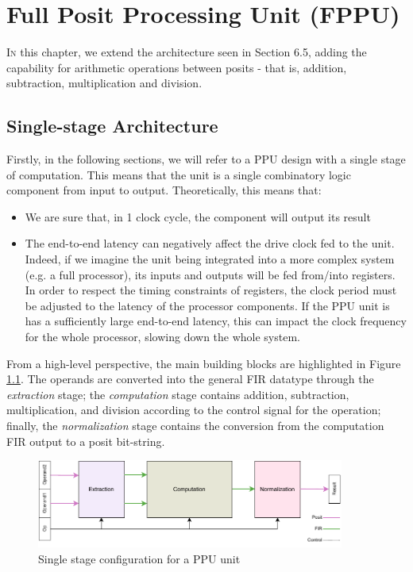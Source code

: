 \chapter{Full Posit Processing Unit (FPPU)}\label{chap:posit_fullppu}

\lettrine{I}{n} this chapter, we extend the architecture seen in Section 6.5, adding the capability for arithmetic operations between posits - that is, addition, subtraction, multiplication and division.



\section{Single-stage Architecture}

Firstly, in the following sections, we will refer to a PPU design with a single stage of computation. This means that the unit is a single combinatory logic component from input to output.
Theoretically, this means that:
\begin{itemize}
    \item We are sure that, in 1 clock cycle, the component will output its result
    \item The end-to-end latency can negatively affect the drive clock fed to the unit. Indeed, if we imagine the unit being integrated into a more complex system (e.g. a full processor), its inputs and outputs will be fed from/into registers. In order to respect the timing constraints of registers, the clock period must be adjusted to the latency of the processor components. If the PPU unit is has a sufficiently large end-to-end latency, this can impact the clock frequency for the whole processor, slowing down the whole system.
\end{itemize}
From a high-level perspective, the main building blocks are highlighted in Figure \ref{fig:overview_ppu}.
The operands are converted into the general FIR datatype through the \textit{extraction} stage; the \textit{computation} stage contains addition, subtraction, multiplication, and division according to the control signal for the operation; finally, the \textit{normalization} stage contains the conversion from the computation FIR output to a posit bit-string.

\begin{figure}
    \begin{center}
    \includegraphics[width=0.9\textwidth]{figures/top.pdf}
    \caption{Single stage configuration for a PPU unit}
    \label{fig:overview_ppu}
    \end{center}
\end{figure}

